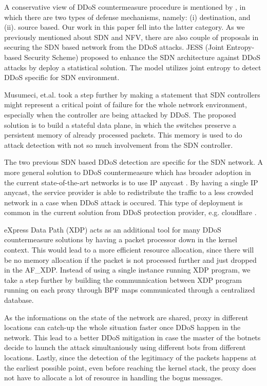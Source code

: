 \documentclass[sigplan,screen]{acmart}
\begin{document}
A conservative view of DDoS countermeasure procedure is mentioned by \cite{6489876}, in which there are two types of defense mechanisms, namely: (i) destination, and (ii). source based. Our work in this paper fell into the latter category. As we previously mentioned about SDN and NFV, there are also couple of proposals in securing the SDN based network from the DDoS attacks. JESS (Joint Entropy-based Security Scheme) \cite{8466805} proposed to enhance the SDN architecture against DDoS attacks by deploy a statistical solution. The model utilizes joint entropy to detect DDoS specific for SDN environment. 

Musumeci, et.al. \cite{9149043} took a step further by making a statement that SDN controllers might represent a critical point of failure for the whole network environment, especially when the controller are being attacked by DDoS. The proposed solution is to build a stateful data plane, in which the switches preserve a persistent memory of already processed packets. This memory is used to do attack detection with not so much involvement from the SDN controller.

The two previous SDN based DDoS detection are specific for the SDN network. A more general solution to DDoS countermeasure which has broader adoption in the current state-of-the-art networks is to use IP anycast \cite{rizvi2020anycast}. By having a single IP anycast, the service provider is able to redistribute the traffic to a less crowded network in a case when DDoS attack is occured. This type of deployment is common in the current solution from DDoS protection provider, e.g. cloudflare \cite{anycast_cf}.

eXpress Data Path (XDP) \cite{10.1145/3281411.3281443} acts as an additional tool for many DDoS countermeasure solutions by having a packet processor down in the kernel context. This would lead to a more efficient resource allocation, since there will be no memory allocation if the packet is not processed further and just dropped in the AF\_XDP. Instead of using a single instance running XDP program, we take a step further by building the communnication between XDP program running on each proxy through BPF maps communicated through a centralized database. 

As the informations on the state of the network are shared, proxy in different locations can catch-up the whole situation faster once DDoS happen in the network. This lead to a better DDoS mitigation in case the master of the botnets decide to launch the attack simultaniously using different bots from different locations. Lastly, since the detection of the legitimacy of the packets happens at the earliest possible point, even before reaching the kernel stack, the proxy does not have to allocate a lot of resource in handling the bogus messages. 
\end{document}
